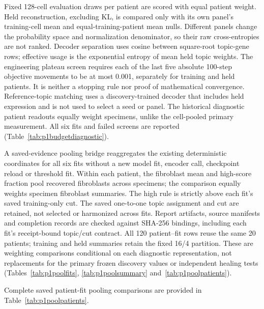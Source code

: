 \documentclass[10pt,a4paper]{article}
\begin{document}
Fixed 128-cell evaluation draws per patient are scored with equal patient weight. Held reconstruction, excluding KL, is compared only with its own panel's training-cell mean and equal-training-patient mean nulls. Different panels change the probability space and normalization denominator, so their raw cross-entropies are not ranked. Decoder separation uses cosine between square-root topic-gene rows; effective usage is the exponential entropy of mean held topic weights. The engineering plateau screen requires each of the last five absolute 100-step objective movements to be at most 0.001, separately for training and held patients. It is neither a stopping rule nor proof of mathematical convergence. Reference-topic matching uses a discovery-trained decoder that includes held expression and is not used to select a seed or panel. The historical diagnostic patient readouts equally weight specimens, unlike the cell-pooled primary measurement. All six fits and failed screens are reported (Table~\ref{tab:p1budgetdiagnostic}).

A saved-evidence pooling bridge reaggregates the existing deterministic coordinates for all six fits without a new model fit, encoder call, checkpoint reload or threshold fit. Within each patient, the fibroblast mean and high-score fraction pool recovered fibroblasts across specimens; the comparison equally weights specimen fibroblast summaries. The high rule is strictly above each fit's saved training-only cut. The saved one-to-one topic assignment and cut are retained, not selected or harmonized across fits. Report artifacts, source manifests and completion records are checked against SHA-256 bindings, including each fit's receipt-bound topic/cut contract. All 120 patient--fit rows reuse the same 20 patients; training and held summaries retain the fixed 16/4 partition. These are weighting comparisons conditional on each diagnostic representation, not replacements for the primary frozen discovery values or independent healing tests (Tables~\ref{tab:p1poolfits}, \ref{tab:p1poolsummary} and~\ref{tab:p1poolpatients}).

Complete saved patient-fit pooling comparisons are provided in Table~\ref{tab:p1poolpatients}.
\end{document}
